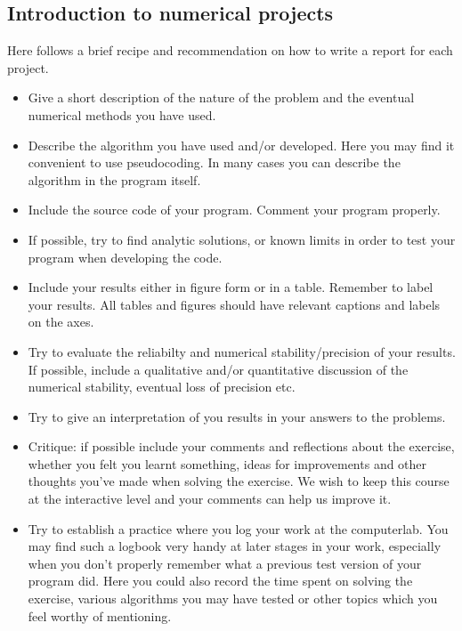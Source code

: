 \documentclass[%
oneside,                 %
final,                   %
10pt]{article}
\begin{document}
\subsection*{Introduction to numerical projects}

Here follows a brief recipe and recommendation on how to write a report for each
project.

\begin{itemize}
  \item Give a short description of the nature of the problem and the eventual  numerical methods you have used.

  \item Describe the algorithm you have used and/or developed. Here you may find it convenient to use pseudocoding. In many cases you can describe the algorithm in the program itself.

  \item Include the source code of your program. Comment your program properly.

  \item If possible, try to find analytic solutions, or known limits in order to test your program when developing the code.

  \item Include your results either in figure form or in a table. Remember to        label your results. All tables and figures should have relevant captions        and labels on the axes.

  \item Try to evaluate the reliabilty and numerical stability/precision of your results. If possible, include a qualitative and/or quantitative discussion of the numerical stability, eventual loss of precision etc.

  \item Try to give an interpretation of you results in your answers to  the problems.

  \item Critique: if possible include your comments and reflections about the  exercise, whether you felt you learnt something, ideas for improvements and  other thoughts you've made when solving the exercise. We wish to keep this course at the interactive level and your comments can help us improve it.

  \item Try to establish a practice where you log your work at the  computerlab. You may find such a logbook very handy at later stages in your work, especially when you don't properly remember  what a previous test version  of your program did. Here you could also record  the time spent on solving the exercise, various algorithms you may have tested or other topics which you feel worthy of mentioning.
\end{itemize}
\end{document}
